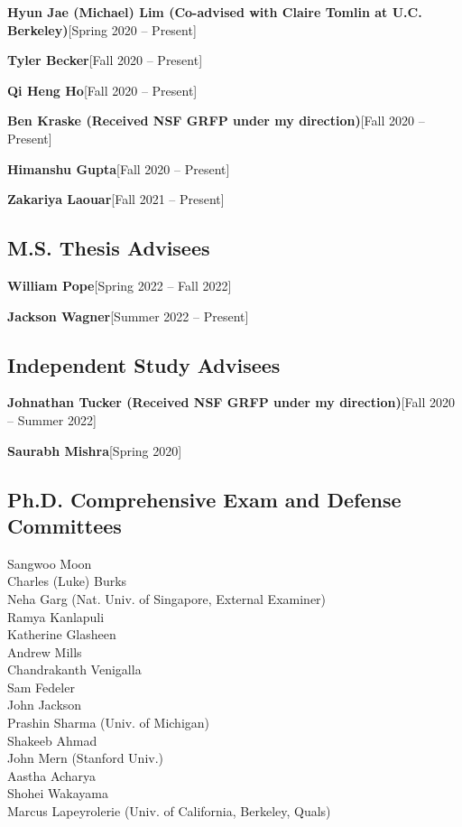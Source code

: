 \documentclass[10pt,roman]{moderncv}
\newcommand{\mycvitem}[2]{
    \textbf{#2}\hfill [#1]\break
}
\begin{document}
\mycvitem{Spring 2020 -- Present}{Hyun Jae (Michael) Lim {\normalfont(Co-advised with Claire Tomlin at U.C. Berkeley)}}
\mycvitem{Fall 2020 -- Present}{Tyler Becker}
\mycvitem{Fall 2020 -- Present}{Qi Heng Ho}
\mycvitem{Fall 2020 -- Present}{Ben Kraske {\normalfont(Received NSF GRFP under my direction)}}
\mycvitem{Fall 2020 -- Present}{Himanshu Gupta}
\mycvitem{Fall 2021 -- Present}{Zakariya Laouar}

\subsection{M.S. Thesis Advisees}
\mycvitem{Spring 2022 -- Fall 2022}{William Pope}
\mycvitem{Summer 2022 -- Present}{Jackson Wagner}

\subsection{Independent Study Advisees}
\mycvitem{Fall 2020 -- Summer 2022}{Johnathan Tucker {\normalfont(Received NSF GRFP under my direction)}}
\mycvitem{Spring 2020}{Saurabh Mishra}

\begin{minipage}{\textwidth}
\subsection{Ph.D. Comprehensive Exam and Defense Committees}
\begin{multicols}{2}
    \small
    Sangwoo Moon\\
    Charles (Luke) Burks\\
    Neha Garg (Nat. Univ. of Singapore, External Examiner)\\
    Ramya Kanlapuli\\
    Katherine Glasheen\\
    Andrew Mills\\
    Chandrakanth Venigalla\\
    Sam Fedeler\\
    John Jackson\\
    Prashin Sharma (Univ. of Michigan)\\
    Shakeeb Ahmad\\
    John Mern (Stanford Univ.)\\
    Aastha Acharya\\
    Shohei Wakayama \\
    Marcus Lapeyrolerie (Univ. of California, Berkeley, Quals)
\end{multicols}
\end{minipage}\\
\\
\end{document}

